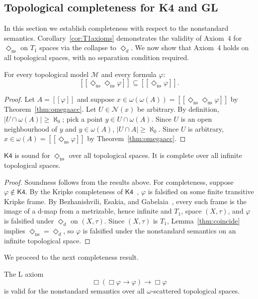 \documentclass[submission,copyright,creativecommons]{eptcs}
\newcommand{\sem}[1]{[\![#1]\!]}
\newcommand{\diam}{\Diamond}
\newcommand{\sq}{\Box}
\newcommand{\lozengens}{\diam_\mathrm{ns}}
\begin{document}
\subsection{Topological completeness for K4 and GL}
In this section we establish completeness with respect to the nonstandard semantics.
Corollary~\ref{cor:T1axioms} demonstrates the validity of Axiom~4 for $\lozengens$ on $T_1$ spaces via the collapse to $\diam_d$.
We now show that Axiom~4 holds on all topological spaces, with no separation condition required.
\begin{lemma}
\label{thm:nsK4}
For every topological model $\mathcal{M}$ and every
formula $\varphi$:
\[
  \sem{\lozengens\lozengens\varphi}
  \subseteq
  \sem{\lozengens\varphi}.
\]
\end{lemma}

\begin{proof}
Let $A = \sem{\varphi}$ and suppose $x \in \omega
(\omega(A))= \sem{\lozengens\lozengens\varphi}$ by Theorem~\ref{thm:omegaacc}. 
Let $U \in \mathcal{N}(x)$ be arbitrary.
By definition, $|U\cap \omega(A)|\geq\aleph_0$; pick a point $y \in U \cap \omega(A)$. 
Since $U$ is an open neighbourhood of $y$ and $y \in \omega(A)$,
$|U \cap A|\geq \aleph_0$. 
Since $U$ is arbitrary, $x \in
\omega(A) = \sem{\lozengens\varphi}$ by Theorem~\ref{thm:omegaacc}.
\end{proof}
\begin{theorem}
\label{thm:nscompleteness}
$\mathsf{K4}$ is sound for $\lozengens$ over all topological spaces. 
It is complete over all infinite topological spaces.
\end{theorem}
\begin{proof}
Soundness follows from the results above.
For completeness, suppose $\varphi \notin \mathsf{K4}$.
By the Kripke completeness of $\mathsf{K4}$~\cite{BlackburnDeRijkeVenema2001}, $\varphi$ is 
falsified on some finite transitive Kripke frame.
By Bezhanishvili, Esakia, and Gabelaia~\cite{BEG2005,BEG2010}, every such frame 
is the image of a d-map from a metrizable, hence infinite and $T_1$, 
space $(X,\tau)$, and $\varphi$ is falsified under $\diam_d$ on $(X,\tau)$.
Since $(X,\tau)$ is $T_1$, Lemma~\ref{thm:coincide} implies $\lozengens = \diam_d$, so $\varphi$ is falsified under the nonstandard semantics on an infinite topological space.
\end{proof}
We proceed to the next completeness result. 
\begin{lemma}
\label{thm:GLchar}
The \textup{L}  axiom
\[
  \sq(\sq\varphi \to \varphi)
  \to
  \sq\varphi
\]
is valid for the nonstandard semantics over all $\omega$-scattered topological spaces.
\end{lemma}
\end{document}
